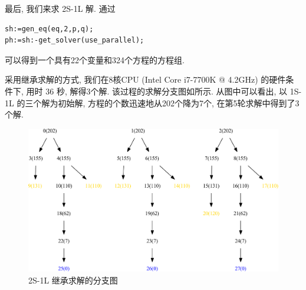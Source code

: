 最后, 我们来求 2S-1L 解. 通过
\begin{verbatim}
sh:=gen_eq(eq,2,p,q);
ph:=sh:-get_solver(use_parallel);
\end{verbatim}
可以得到一个具有22个变量和324个方程的方程组. 

采用继承求解的方式, 我们在8核CPU (Intel Core i7-7700K @ 4.2GHz) 的硬件条件下, 用时 36 秒, 解得3个解. 该过程的求解分支图如所示. 从图中可以看出, 以 1S-1L 的三个解为初始解, 方程的个数迅速地从202个降为7个, 在第5轮求解中得到了3个解. 

\begin{figure}[htbp]
\centering
\includegraphics[width=\textwidth]{fig/2S1L-ext.pdf}
\caption{2S-1L 继承求解的分支图}\label{sb2-e}
\end{figure}

